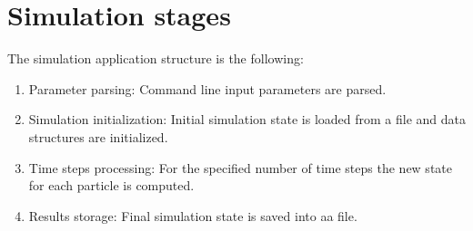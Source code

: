 \section{Simulation stages}

The simulation application structure is the following:

\begin{enumerate}
\item Parameter parsing: Command line input parameters are parsed.
\item Simulation initialization: Initial simulation state is loaded from a file
and data structures are initialized.
\item Time steps processing: For the specified number of time steps the new
state for each particle is computed.
\item Results storage: Final simulation state is saved into aa file.
\end{enumerate}





